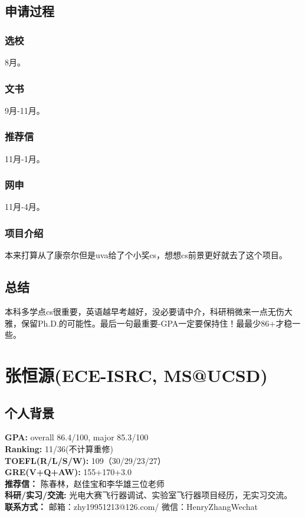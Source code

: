 \documentclass[a4paper,UTF8]{book}
\begin{document}
    \subsection*{申请过程}
        \subsubsection*{选校}
        8月。
        \subsubsection*{文书}
        9月-11月。
        \subsubsection*{推荐信}
        11月-1月。
        \subsubsection*{网申}
        11月-4月。
        \subsubsection*{项目介绍}
        本来打算从了康奈尔但是uva给了个小奖cs，想想cs前景更好就去了这个项目。

    \subsection*{总结}
    本科多学点cs很重要，英语越早考越好，没必要请中介，科研稍微来一点无伤大雅，保留Ph.D.的可能性。最后一句最重要-GPA一定要保持住！最最少86+才稳一些。



\clearpage
\section{张恒源(ECE-ISRC, MS@UCSD)}
    \subsection*{个人背景}
        \textbf{GPA:} overall 86.4/100, major 85.3/100\\
        \textbf{Ranking:} 11/36(不计算重修)\\
        \textbf{TOEFL(R/L/S/W):} 109（30/29/23/27）\\
        \textbf{GRE(V+Q+AW):} 155+170+3.0\\
        \textbf{推荐信：} 陈春林，赵佳宝和李华雄三位老师\\
        \textbf{科研/实习/交流:} 光电大赛飞行器调试、实验室飞行器项目经历，无实习交流。\\ 
        \textbf{联系方式：} 邮箱：zhy19951213@126.com/ 微信：HenryZhangWechat
\end{document}
